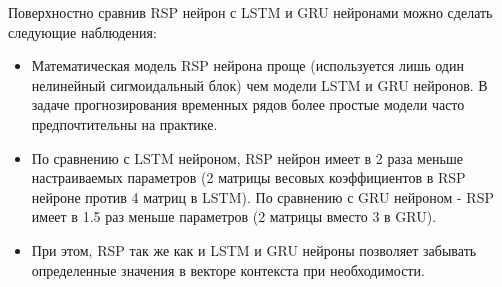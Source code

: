 \documentclass[11pt]{article}
\begin{document}
Поверхностно сравнив RSP нейрон с LSTM и GRU нейронами можно сделать следующие наблюдения:
\begin{itemize}
\item Математическая модель RSP нейрона проще (используется лишь один нелинейный сигмоидальный блок) чем модели LSTM и GRU нейронов. В задаче прогнозирования временных рядов более простые модели часто предпочтительны на практике.
\item По сравнению с LSTM нейроном, RSP нейрон имеет в 2 раза меньше настраиваемых параметров (2 матрицы весовых коэффициентов в RSP нейроне против 4 матриц в LSTM). По сравнению с GRU нейроном - RSP имеет в 1.5 раз меньше параметров (2 матрицы вместо 3 в GRU).
\item При этом, RSP так же как и LSTM и GRU нейроны позволяет забывать определенные значения в векторе контекста при необходимости.
 
\end{itemize}
  
\end{document}
